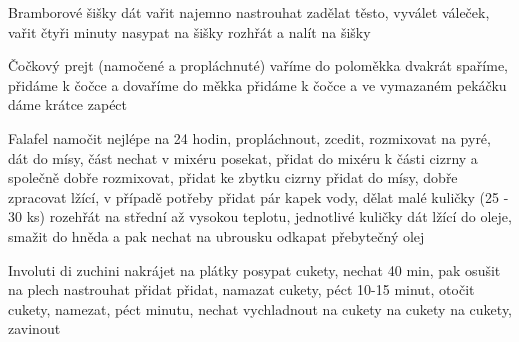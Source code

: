 \documentclass[12pt,a4paper]{article}
\begin{document}
\begin{recipe}{Bramborové šišky}
   dát vařit
   najemno nastrouhat
   zadělat těsto, vyválet váleček, vařit čtyři minuty
   nasypat na šišky
   rozhřát a nalít na šišky
\end{recipe}
\newpage

\begin{recipe}{Čočkový prejt}
   (namočené a propláchnuté)
   vaříme do poloměkka
   dvakrát spaříme, přidáme k čočce a dovaříme do měkka
   přidáme k čočce a ve vymazaném pekáčku dáme krátce zapéct
\end{recipe}
\newpage

\begin{recipe}{Falafel}
   namočit nejlépe na 24 hodin, propláchnout, zcedit, rozmixovat na pyré, dát do mísy, část nechat v mixéru
   posekat, přidat do mixéru k části cizrny a společně dobře rozmixovat, přidat ke zbytku cizrny
   přidat do mísy, dobře zpracovat lžící, v případě potřeby přidat pár kapek vody, dělat malé kuličky  (25 - 30 ks)
   rozehřát na střední až vysokou teplotu, jednotlivé kuličky dát lžící do oleje, smažit do hněda a pak nechat na ubrousku odkapat přebytečný olej
\end{recipe}
\newpage

\begin{recipe}{Involuti di zuchini}
   nakrájet na plátky
   posypat cukety, nechat 40 min, pak osušit
   na plech
   nastrouhat
   přidat
   přidat, namazat cukety, péct 10-15 minut, otočit cukety, namezat, péct minutu, nechat vychladnout
   na cukety
   na cukety
   na cukety, zavinout
\end{recipe}
\newpage
\end{document}
